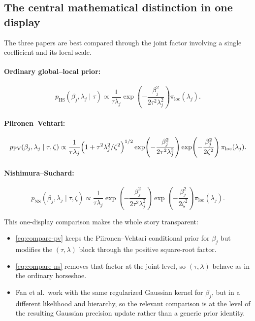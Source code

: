 \documentclass[11pt]{article}
\newcommand{\HS}{\mathrm{HS}}
\newcommand{\PV}{\mathrm{PV}}
\newcommand{\NS}{\mathrm{NS}}
\newcommand{\Loc}{\pi_{\mathrm{loc}}}
\begin{document}
\subsection{The central mathematical distinction in one display}

The three papers are best compared through the joint factor involving a single coefficient and its local scale.

\paragraph{Ordinary global--local prior:}
\begin{equation}
p_{\HS}(\beta_j,\lambda_j \mid \tau)
\propto
\frac{1}{\tau\lambda_j}
\exp\!\left(-\frac{\beta_j^2}{2\tau^2\lambda_j^2}\right)\Loc(\lambda_j).
\label{eq:compare-hs}
\end{equation}

\paragraph{Piironen--Vehtari:}
\begin{equation}
p_{\PV}(\beta_j,\lambda_j \mid \tau,\zeta)
\propto
\frac{1}{\tau\lambda_j}
\Bigl(1+\tau^2\lambda_j^2/\zeta^2\Bigr)^{1/2}
\exp\!\left(-\frac{\beta_j^2}{2\tau^2\lambda_j^2}\right)
\exp\!\left(-\frac{\beta_j^2}{2\zeta^2}\right)
\Loc(\lambda_j).
\label{eq:compare-pv}
\end{equation}

\paragraph{Nishimura--Suchard:}
\begin{equation}
p_{\NS}(\beta_j,\lambda_j \mid \tau,\zeta)
\propto
\frac{1}{\tau\lambda_j}
\exp\!\left(-\frac{\beta_j^2}{2\tau^2\lambda_j^2}\right)
\exp\!\left(-\frac{\beta_j^2}{2\zeta^2}\right)
\Loc(\lambda_j).
\label{eq:compare-ns}
\end{equation}

This one-display comparison makes the whole story transparent:
\begin{itemize}
\item \eqref{eq:compare-pv} keeps the Piironen--Vehtari conditional prior for $\beta_j$ but modifies the $(\tau,\lambda)$ block through the positive square-root factor.
\item \eqref{eq:compare-ns} removes that factor at the joint level, so $(\tau,\lambda)$ behave as in the ordinary horseshoe.
\item Fan et al.\ work with the same regularized Gaussian kernel for $\beta_j$, but in a different likelihood and hierarchy, so the relevant comparison is at the level of the resulting Gaussian precision update rather than a generic prior identity.
\end{itemize}
\end{document}
